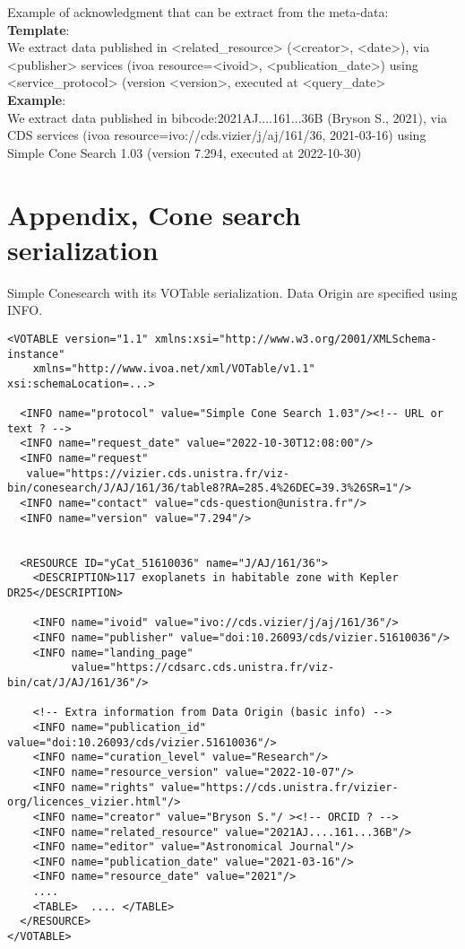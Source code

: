 \documentclass[11pt,a4paper]{ivoa}
\begin{document}
Example of acknowledgment that can be extract from the meta-data:\\

\textbf{Template}:\\
We extract data published in <related\_resource> (<creator>, <date>),
via <publisher> services (ivoa resource=<ivoid>, <publication\_date>)
using <service\_protocol> (version <version>, executed at <query\_date>\\


\textbf{Example}:\\
We extract data published in bibcode:2021AJ....161...36B (Bryson S., 2021),
via CDS services (ivoa resource=ivo://cds.vizier/j/aj/161/36, 2021-03-16)
using Simple Cone Search 1.03 (version 7.294, executed at 2022-10-30)



\appendix
\section{Appendix, Cone search serialization}\label{appendixA}
Simple Conesearch with its VOTable serialization. Data Origin are specified using  INFO.
\begin{verbatim}
<VOTABLE version="1.1" xmlns:xsi="http://www.w3.org/2001/XMLSchema-instance"
    xmlns="http://www.ivoa.net/xml/VOTable/v1.1" xsi:schemaLocation=...>

  <INFO name="protocol" value="Simple Cone Search 1.03"/><!-- URL or text ? -->
  <INFO name="request_date" value="2022-10-30T12:08:00"/>
  <INFO name="request" 
   value="https://vizier.cds.unistra.fr/viz-bin/conesearch/J/AJ/161/36/table8?RA=285.4%26DEC=39.3%26SR=1"/>
  <INFO name="contact" value="cds-question@unistra.fr"/>
  <INFO name="version" value="7.294"/>


  <RESOURCE ID="yCat_51610036" name="J/AJ/161/36">
    <DESCRIPTION>117 exoplanets in habitable zone with Kepler DR25</DESCRIPTION>

    <INFO name="ivoid" value="ivo://cds.vizier/j/aj/161/36"/>
    <INFO name="publisher" value="doi:10.26093/cds/vizier.51610036"/>
    <INFO name="landing_page" 
          value="https://cdsarc.cds.unistra.fr/viz-bin/cat/J/AJ/161/36"/>

    <!-- Extra information from Data Origin (basic info) -->
    <INFO name="publication_id" value="doi:10.26093/cds/vizier.51610036"/>
    <INFO name="curation_level" value="Research"/>
    <INFO name="resource_version" value="2022-10-07"/>
    <INFO name="rights" value="https://cds.unistra.fr/vizier-org/licences_vizier.html"/>
    <INFO name="creator" value="Bryson S."/ ><!-- ORCID ? -->
    <INFO name="related_resource" value="2021AJ....161...36B"/>
    <INFO name="editor" value="Astronomical Journal"/>
    <INFO name="publication_date" value="2021-03-16"/>
    <INFO name="resource_date" value="2021"/>
    ....
    <TABLE>  .... </TABLE>
  </RESOURCE>
</VOTABLE>
\end{verbatim}
\end{document}
